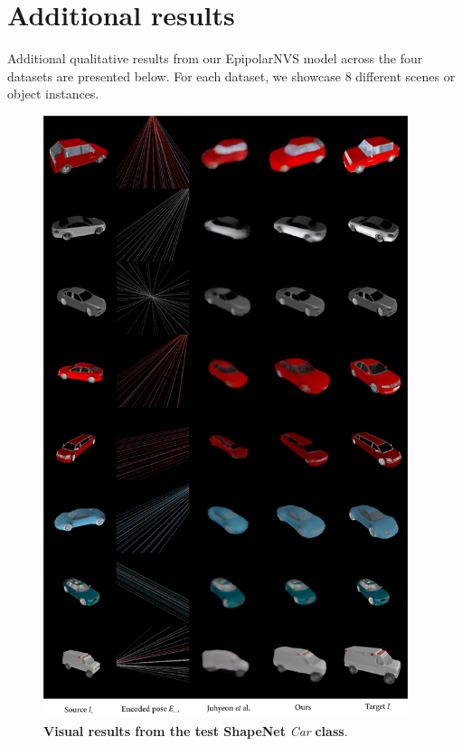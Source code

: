 \section{Additional results}

Additional qualitative results from our EpipolarNVS model across the four datasets are presented below. For each dataset, we showcase 8 different scenes or object instances.

\begin{figure}[htp!]
    \begin{center}
    \includegraphics[width=0.95\textwidth]{images/epipolarnvs/SuppMat_Car_New.png}
    \end{center}
     \caption{\textbf{Visual results from the test ShapeNet} \citep{xu2019disn} \textit{Car} \textbf{class}.}     
     \label{fig:add_visCar}
\end{figure}

